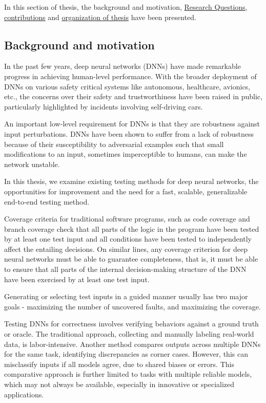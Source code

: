 In this section of thesis, the background and motivation,  \hyperlink{researchquestions}{Research Questions}, \hyperlink{contributions}{contributions} and \hyperlink{organization of thesis}{organization of thesis} have been presented.

\subsection{Background and motivation}

In the past few years, deep neural networks (DNNs) have made remarkable progress in achieving human-level performance. With the broader deployment of DNNs on various safety critical systems like autonomous, healthcare, avionics, etc., the concerns over their safety and trustworthiness have been raised in public, particularly highlighted by incidents involving self-driving cars.

An important low-level requirement for DNNs is that they are robustness against input perturbations. DNNs have been shown to suffer from a lack of robustness because of their susceptibility to adversarial examples such that small modifications to an input, sometimes imperceptible to humans, can make the network unstable.

In this thesis, we examine existing testing methods for
deep neural networks, the opportunities for improvement and
the need for a fast, scalable, generalizable end-to-end testing
method.

Coverage criteria for traditional software programs, such as code coverage and branch coverage check that all parts of the logic in the program have been tested by at least one test input and all conditions have been tested to independently affect the entailing decisions. On similar lines, any coverage criterion for deep neural networks must be able to guarantee completeness, that is, it must be able to ensure that all parts of the internal decision-making structure of the DNN have been exercised by at least one test input.

Generating or selecting test inputs in a guided manner usually has two major goals - maximizing the number of uncovered faults, and maximizing the coverage.
	
Testing DNNs for correctness involves verifying behaviors against a ground truth or oracle. The traditional approach, collecting and manually labeling real-world data, is labor-intensive. Another method compares outputs across multiple DNNs for the same task, identifying discrepancies as corner cases. However, this can misclassify inputs if all models agree, due to shared biases or errors. This comparative approach is further limited to tasks with multiple reliable models, which may not always be available, especially in innovative or specialized applications.



